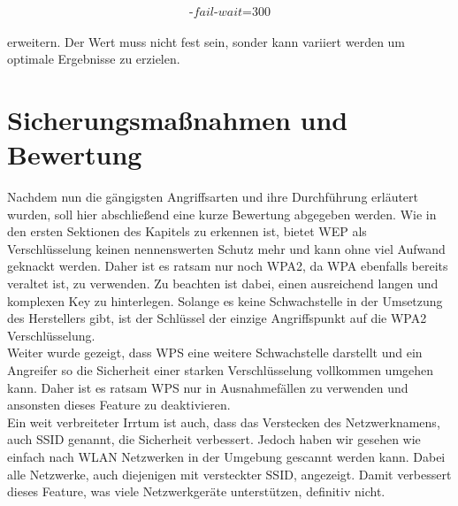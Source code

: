 $$\text{-}fail\text{-}wait\text{=}300$$\\

erweitern. Der Wert muss nicht fest sein, sonder kann variiert werden um optimale Ergebnisse zu erzielen. 



\section{Sicherungsmaßnahmen und Bewertung}

Nachdem nun die gängigsten Angriffsarten und ihre Durchführung erläutert wurden, soll hier abschließend eine kurze Bewertung abgegeben werden. Wie in den ersten Sektionen des Kapitels zu erkennen ist, bietet WEP als Verschlüsselung keinen nennenswerten Schutz mehr und kann ohne viel Aufwand geknackt werden. Daher ist es ratsam nur noch WPA2, da WPA ebenfalls bereits veraltet ist, zu verwenden. Zu beachten ist dabei, einen ausreichend langen und komplexen Key zu hinterlegen. Solange es keine Schwachstelle in der Umsetzung des Herstellers gibt, ist der Schlüssel der einzige Angriffspunkt auf die WPA2 Verschlüsselung. \\

Weiter wurde gezeigt, dass WPS eine weitere Schwachstelle darstellt und ein Angreifer so die Sicherheit einer starken Verschlüsselung vollkommen umgehen kann. Daher ist es ratsam WPS nur in Ausnahmefällen zu verwenden und ansonsten dieses Feature zu deaktivieren. \\

Ein weit verbreiteter Irrtum ist auch, dass das Verstecken des Netzwerknamens, auch SSID genannt, die Sicherheit verbessert. Jedoch haben wir gesehen wie einfach nach WLAN Netzwerken in der Umgebung gescannt werden kann. Dabei alle Netzwerke, auch diejenigen mit versteckter SSID, angezeigt. Damit verbessert dieses Feature, was viele Netzwerkgeräte unterstützen, definitiv nicht. 


